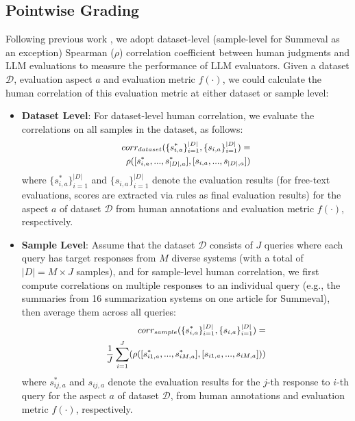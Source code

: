 \subsection{Pointwise Grading}
Following previous work \cite{liu-etal-2024-hd, liu-etal-2024-calibrating, zhong-etal-2022-towards}, we adopt dataset-level (sample-level for Summeval as an exception) Spearman ($\rho$) correlation coefficient between human judgments and LLM evaluations to measure the performance of LLM evaluators. 
Given a dataset $\mathcal{D}$, evaluation aspect $a$ and evaluation metric $f(\cdot)$, we could calculate the human correlation of this evaluation metric at either dataset or sample level:
\begin{itemize}
\item \textbf{Dataset Level}: For dataset-level human correlation, we evaluate the correlations on all samples in the dataset, as follows:
\begin{equation}
\small
\begin{aligned}
corr_{dataset}(\{s^*_{i,a}\}_{i=1}^{|D|}, \{s_{i,a}\}_{i=1}^{|D|}) = & \\
\rho([{s}^*_{i,a}, ..., {s}^*_{|D|,a}], [s_{i,a}, ..., s_{|D|,a}])
\end{aligned}
\end{equation}
where $\{s^*_{i,a}\}_{i=1}^{|D|}$ and $\{s_{i,a}\}_{i=1}^{|D|}$ denote the 
evaluation results (for free-text evaluations, scores are extracted via rules as final evaluation results) for the aspect $a$ of dataset $\mathcal{D}$ from human annotations and evaluation metric $f(\cdot)$, respectively. 
\item \textbf{Sample Level}: Assume that the dataset $\mathcal{D}$ consists of $J$ queries where each query has target responses from $M$ diverse systems (with a total of $|D| = M \times J$ samples),
and for sample-level human correlation, we first compute correlations on multiple responses to an individual query (e.g., the summaries from 16 summarization systems on one article for Summeval), then average them across all queries:
\begin{equation}
\small
\begin{aligned}
corr_{sample}(\{s^*_{i,a}\}_{i=1}^{|D|}, \{s_{i,a}\}_{i=1}^{|D|}) = & \\
\frac{1}{J} \sum_{i=1}^{J}(\rho([{s}^*_{i1,a}, ..., {s}^*_{iM,a}], [s_{i1,a}, ..., s_{iM,a}]))
\end{aligned}
\end{equation}
where $s^*_{ij,a}$ and $s_{ij,a}$ denote the evaluation results for the $j$-th response to $i$-th query 
for the aspect $a$ of dataset $\mathcal{D}$, from human annotations and evaluation metric $f(\cdot)$, respectively.
\end{itemize}

